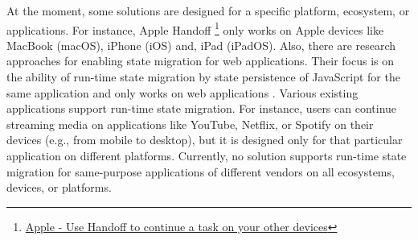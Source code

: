 At the moment, some solutions are designed for a specific platform, ecosystem, or applications.
For instance, Apple Handoff \footnote{\href{https://support.apple.com/en-us/HT209455}{Apple - Use Handoff to continue a task on your other devices}} only works on Apple devices like MacBook (macOS), iPhone (iOS) and, iPad (iPadOS).
Also, there are research approaches for enabling state migration for web applications.
Their focus is on the ability of run-time state migration by state persistence of JavaScript for the same application and only works on web applications  \cite{javascript-migration}.
Various existing applications support run-time state migration.
For instance, users can continue streaming media on applications like YouTube, Netflix, or Spotify on their devices (e.g., from mobile to desktop), but it is designed only for that particular application on different platforms.
Currently, no solution supports run-time state migration for same-purpose applications of different vendors on all ecosystems, devices, or platforms.
